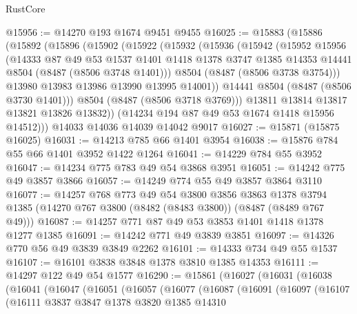 \begin{lexlean}{RustCore}
\begin{coremodule}
@15956 := @14270 @193 @1674 @9451 @9455
@16025 := @15883
    (@15886
      (@15892
        (@15896
          (@15902
            (@15922
              (@15932
                (@15936
                  (@15942
                    (@15952
                      @15956
                      (@14333
                        @87
                        @49
                        @53
                        @1537
                        @1401
                        @1418
                        @1378
                        @3747
                        @1385
                        @14353
                        @14441
                        @8504
                        (@8487 (@8506 @3748 @1401)))
                      @8504
                      (@8487 (@8506 @3738 @3754)))
                    @13980
                    @13983
                    @13986
                    @13990
                    @13995
                    @14001))
                @14441
                @8504
                (@8487 (@8506 @3730 @1401)))
              @8504
              (@8487 (@8506 @3718 @3769)))
            @13811
            @13814
            @13817
            @13821
            @13826
            @13832))
        (@14234 @194 @87 @49 @53 @1674 @1418 @15956 @14512)))
    @14033
    @14036
    @14039
    @14042
    @9017
@16027 := @15871 (@15875 @16025)
@16031 := @14213 @785 @66 @1401 @3954
@16038 := @15876 @784 @55 @66 @1401 @3952 @1422 @1264
@16041 := @14229 @784 @55 @3952
@16047 := @14234 @775 @783 @49 @54 @3868 @3951
@16051 := @14242 @775 @49 @3857 @3866
@16057 := @14249 @774 @55 @49 @3857 @3864 @3110
@16077 := @14257
    @768
    @773
    @49
    @54
    @3800
    @3856
    @3863
    @1378
    @3794
    @1385
    (@14270 @767 @3800 (@8482 (@8483 @3800)) (@8487 (@8489 @767 @49)))
@16087 := @14257 @771 @87 @49 @53 @3853 @1401 @1418 @1378 @1277 @1385
@16091 := @14242 @771 @49 @3839 @3851
@16097 := @14326 @770 @56 @49 @3839 @3849 @2262
@16101 := @14333 @734 @49 @55 @1537
@16107 := @16101 @3838 @3848 @1378 @3810 @1385 @14353
@16111 := @14297 @122 @49 @54 @1577
@16290 := @15861
    (@16027
      (@16031
        (@16038
          (@16041
            (@16047
              (@16051
                (@16057
                  (@16077
                    (@16087
                      (@16091
                        (@16097
                          (@16107
                            (@16111
                              @3837
                              @3847
                              @1378
                              @3820
                              @1385
                              @14310

\end{coremodule}
\end{lexlean}
